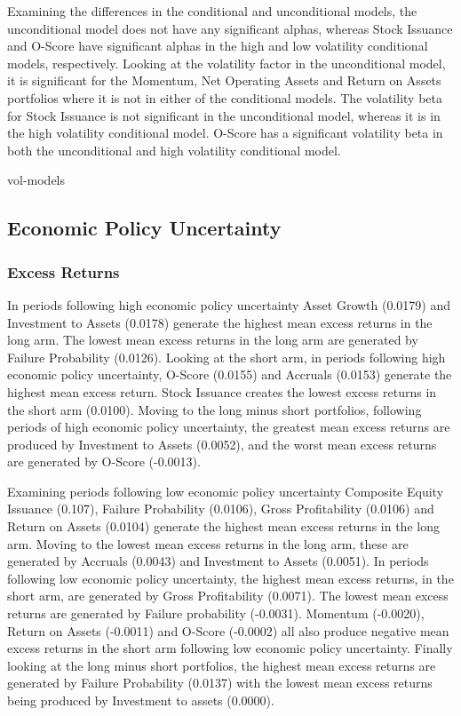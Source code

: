\documentclass[a4paper,12pt]{article}                 %
\begin{document}
Examining the differences in the conditional and unconditional models, the unconditional model does not have any significant alphas, whereas Stock Issuance and O-Score have significant alphas in the high and low volatility conditional models, respectively. Looking at the volatility factor in the unconditional model, it is significant for the Momentum, Net Operating Assets and Return on Assets portfolios where it is not in either of the conditional models. The volatility beta for Stock Issuance is not significant in the unconditional model, whereas it is in the high volatility conditional model. O-Score has a significant volatility beta in both the unconditional and high volatility conditional model.

{vol-models}

\FloatBarrier
\subsection{Economic Policy Uncertainty}
\subsubsection{Excess Returns}
In periods following high economic policy uncertainty Asset Growth (0.0179) and Investment to Assets (0.0178) generate the highest mean excess returns in the long arm. The lowest mean excess returns in the long arm are generated by Failure Probability (0.0126). Looking at the short arm, in periods following high economic policy uncertainty, O-Score (0.0155) and Accruals (0.0153) generate the highest mean excess return. Stock Issuance creates the lowest excess returns in the short arm (0.0100). Moving to the long minus short portfolios, following periods of high economic policy uncertainty, the greatest mean excess returns are produced by Investment to Assets (0.0052), and the worst mean excess returns are generated by O-Score (-0.0013).

Examining periods following low economic policy uncertainty Composite Equity Issuance (0.107), Failure Probability (0.0106), Gross Profitability (0.0106) and Return on Assets (0.0104) generate the highest mean excess returns in the long arm. Moving to the lowest mean excess returns in the long arm, these are generated by Accruals (0.0043) and Investment to Assets (0.0051). In periods following low economic policy uncertainty, the highest mean excess returns, in the short arm, are generated by Gross Profitability (0.0071). The lowest mean excess returns are generated by Failure probability (-0.0031). Momentum (-0.0020), Return on Assets (-0.0011) and O-Score (-0.0002) all also produce negative mean excess returns in the short arm following low economic policy uncertainty. Finally looking at the long minus short portfolios, the highest mean excess returns are generated by Failure Probability (0.0137) with the lowest mean excess returns being produced by Investment to assets (0.0000).
\end{document}
